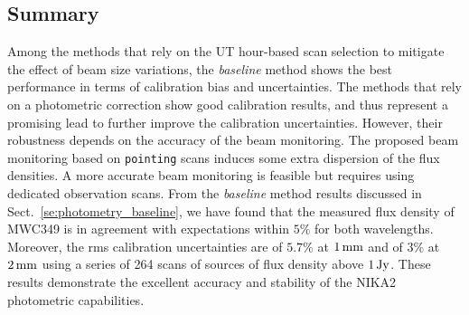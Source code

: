 \subsection{Summary}
\label{se:photometry_summary}
Among the methods that rely on the UT hour-based
scan selection to mitigate the effect of beam size variations, the
\emph{baseline} method shows the best performance in terms of calibration
bias and uncertainties. The methods that rely on a photometric correction
show good calibration results, and thus represent a promising lead
to further improve the calibration uncertainties. However, their
robustness depends on the accuracy of the beam monitoring. {\lp The
proposed beam monitoring based on {\tt pointing} scans induces some
extra dispersion of the flux densities. A more accurate beam monitoring is
feasible but requires using dedicated observation scans.} 
From the \emph{baseline} method results discussed in
Sect.~\ref{se:photometry_baseline}, we have found that the measured
flux density of MWC349 is in agreement with expectations within $5\%$
for both wavelengths. Moreover, the rms calibration
uncertainties are of $5.7\%$ at $1\,\rm{mm}$ and of $3\%$ at $2\,\rm{mm}$
using a series of 264 scans of sources of flux density above
$1\, \rm{Jy}$.
These results demonstrate the excellent accuracy and stability of the
NIKA2 photometric capabilities.





